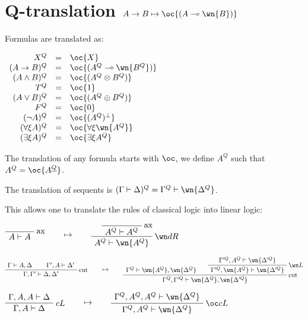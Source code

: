 \section{\texorpdfstring{Q-translation \(A\imp B \mapsto \oc{(A\limp\wn{B})}\)}{Q-translation A\textbackslash{}imp B \textbackslash{}mapsto \textbackslash{}oc\{(A\textbackslash{}limp\textbackslash{}wn\{B\})\}}}\label{q-translation-aimp-b-mapsto-ocalimpwnb}

Formulas are translated as:

\(\begin{array}{rcl}
X^Q &  = &  \oc{X} \\
(A\imp B)^Q &  = &  \oc{(A^Q\limp\wn{B^Q})} \\
(A\wedge B)^Q &  = &  \oc{(A^Q \tens B^Q)} \\
T^Q &  = &  \oc{\one} \\
(A\vee B)^Q &  = &  \oc{(A^Q\plus B^Q)} \\
F^Q &  = &  \oc{\zero} \\
(\neg A)^Q &  = &  \oc{(A^Q)\orth} \\
(\forall\xi A)^Q &  = &  \oc{\forall\xi \wn{A^Q}} \\
(\exists\xi A)^Q &  = &  \oc{\exists\xi A^Q}
\end{array}\)

The translation of any formula starts with \(\oc\), we define
\(A^{\underline{Q}}\) such that \(A^Q=\oc{A^{\underline{Q}}}\).

The translation of sequents is
\((\Gamma\vdash\Delta)^Q = \Gamma^Q\vdash\wn{\Delta^Q}\).

This allows one to translate the rules of classical logic into linear
logic:

\(\LabelRule{\rulename{ax}}
\NulRule{A\vdash A}
\DisplayProof
\qquad\mapsto\qquad
\LabelRule{\rulename{ax}}
\NulRule{A^Q\vdash A^Q}
\LabelRule{\wn d R}
\UnaRule{A^Q\vdash \wn{A^Q}}
\DisplayProof\)

\(\AxRule{\Gamma\vdash A,\Delta}
\AxRule{\Gamma',A\vdash \Delta'}
\LabelRule{\rulename{cut}}
\BinRule{\Gamma,\Gamma'\vdash \Delta,\Delta'}
\DisplayProof
\qquad\mapsto\qquad
\AxRule{\Gamma^Q\vdash \wn{A^Q},\wn{\Delta^Q}}
\AxRule{\Gamma'^Q,A^Q\vdash \wn{\Delta'^Q}}
\LabelRule{\wn L}
\UnaRule{\Gamma'^Q,\wn{A^Q}\vdash \wn{\Delta'^Q}}
\LabelRule{\rulename{cut}}
\BinRule{\Gamma^Q,\Gamma'^Q\vdash \wn{\Delta^Q},\wn{\Delta'^Q}}
\DisplayProof\)

\(\AxRule{\Gamma,A,A\vdash \Delta}
\LabelRule{c L}
\UnaRule{\Gamma,A\vdash \Delta}
\DisplayProof
\qquad\mapsto\qquad
\AxRule{\Gamma^Q,A^Q,A^Q\vdash \wn{\Delta^Q}}
\LabelRule{\oc c L}
\UnaRule{\Gamma^Q,A^Q\vdash \wn{\Delta^Q}}
\DisplayProof\)

